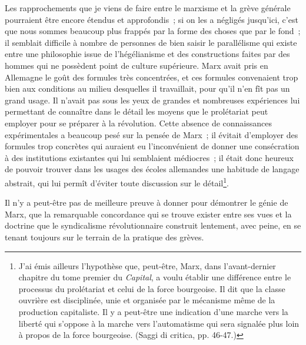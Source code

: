 \documentclass[french,twoside]{book} %
\begin{document}
\noindent Les rapprochements que je viens de faire entre le marxisme et la grève générale pourraient être encore étendus et approfondis ; si on les a négligés jusqu’ici, c’est que nous sommes beaucoup plus frappés par la forme des choses que par le fond ; il semblait difficile à nombre de personnes de bien saisir le parallélisme qui existe entre une philosophie issue de l’hégélianisme et des constructions faites par des hommes qui ne possèdent point de culture supérieure. Marx avait pris en Allemagne le goût des formules très concentrées, et ces formules convenaient trop bien aux conditions au milieu desquelles il travaillait, pour qu’il n’en fît pas un grand usage. Il n’avait pas sous les yeux de grandes et nombreuses expériences lui permettant de connaître dans le détail les moyens que le prolétariat peut employer pour se préparer à la révolution. Cette absence de connaissances expérimentales a beaucoup pesé sur la pensée de Marx ; il évitait d’employer des formules trop concrètes qui auraient eu l’inconvénient de donner une consécration à des institutions existantes qui lui semblaient médiocres ; il était donc heureux de pouvoir trouver dans les usages des écoles allemandes une habitude de langage abstrait, qui lui permît d’éviter toute discussion sur le détail\footnote{ \noindent J’ai émis ailleurs l’hypothèse que, peut-être, Marx, dans l’avant-dernier chapitre du tome premier du \emph{Capital}, a voulu établir une différence entre le processus du prolétariat et celui de la force bourgeoise. Il dit que la classe ouvrière est disciplinée, unie et organisée par le mécanisme même de la production capitaliste. Il y a peut-être une indication d’une marche vers la liberté qui s’oppose à la marche vers l’automatisme qui sera signalée plus loin à propos de la force bourgeoise. (Saggi di critica, pp. 46-47.)
 }.\par
 Il n’y a peut-être pas de meilleure preuve à donner pour démontrer le génie de Marx, que la remarquable concordance qui se trouve exister entre ses vues et la doctrine que le syndicalisme révolutionnaire construit lentement, avec peine, en se tenant toujours sur le terrain de la pratique des grèves.
\end{document}
